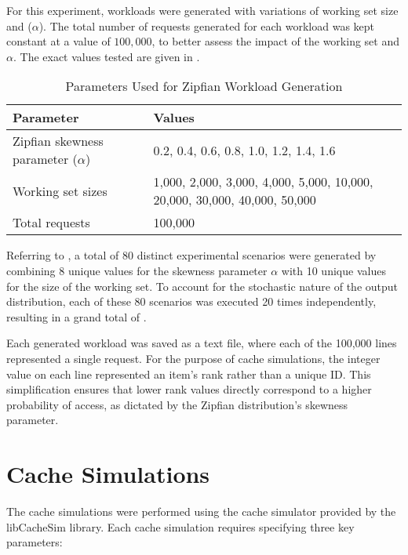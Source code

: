 For this experiment, workloads were generated with variations of working set size and  ($\alpha$). The total number of requests generated for each workload was kept constant at a value of \textbf{$100,000$}, to better assess the impact of the working set and $\alpha$. The exact values tested are given in .

\begin{table}[h!]
    \centering
    \caption{Parameters Used for Zipfian Workload Generation}
    \label{tab: data-params}
    \begin{tabularx}{\textwidth}{lX}
        \toprule
        \textbf{Parameter} & \textbf{Values} \\
        \midrule
        Zipfian skewness parameter ($\alpha$) & 0.2, 0.4, 0.6, 0.8, 1.0, 1.2, 1.4, 1.6 \\
        Working set sizes & 1,000, 2,000, 3,000, 4,000, 5,000, 10,000, 20,000, 30,000, 40,000, 50,000 \\
        Total requests & 100,000 \\
        \bottomrule
    \end{tabularx}
\end{table}

Referring to , a total of 80 distinct experimental scenarios were generated by combining 8 unique values for the skewness parameter $\alpha$ with 10 unique values for the size of the working set. To account for the stochastic nature of the output distribution, each of these 80 scenarios was executed 20 times independently, resulting in a grand total of .

Each generated workload was saved as a text file, where each of the 100,000 lines represented a single request. For the purpose of cache simulations, the integer value on each line represented an item's rank rather than a unique ID. This simplification ensures that lower rank values directly correspond to a higher probability of access, as dictated by the Zipfian distribution's skewness parameter.

\section{Cache Simulations}\label{subsec: cache-simulations}

The cache simulations were performed using the cache simulator provided by the libCacheSim library. Each cache simulation requires specifying three key parameters:

